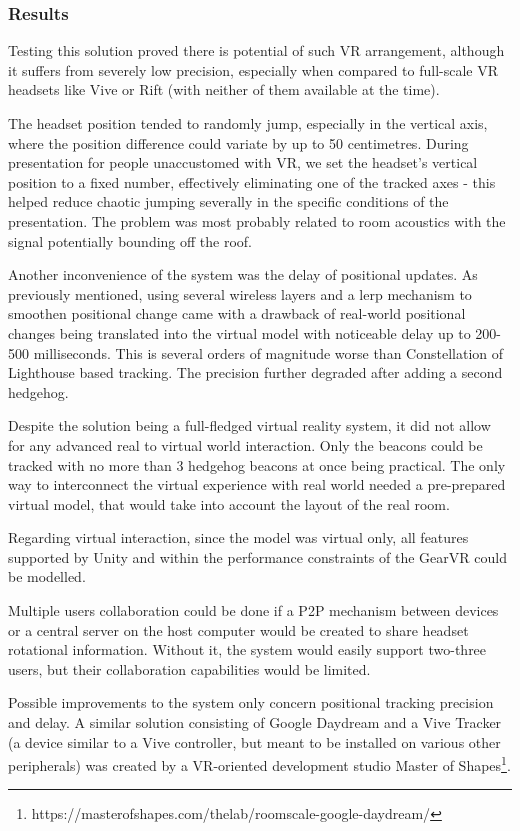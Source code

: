 \documentclass[12pt, a4paper]{article}
\begin{document}
\subsubsection{Results}
Testing this solution proved there is potential of such VR arrangement, although it suffers from severely low precision, especially when compared to full-scale VR headsets like Vive or Rift (with neither of them available at the time).

The headset position tended to randomly jump, especially in the vertical axis, where the position difference could variate by up to 50 centimetres. During presentation for people unaccustomed with VR, we set the headset’s vertical position to a fixed number, effectively eliminating one of the tracked axes - this helped reduce chaotic jumping severally in the specific conditions of the presentation. The problem was most probably related to room acoustics with the signal potentially bounding off the roof.

Another inconvenience of the system was the delay of positional updates. As previously mentioned, using several wireless layers and a lerp mechanism to smoothen positional change came with a drawback of real-world positional changes being translated into the virtual model with noticeable delay up to 200-500 milliseconds. This is several orders of magnitude worse than Constellation of Lighthouse based tracking. The precision further degraded after adding a second hedgehog.

Despite the solution being a full-fledged virtual reality system, it did not allow for any advanced real to virtual world interaction. Only the beacons could be tracked with no more than 3 hedgehog beacons at once being practical. The only way to interconnect the virtual experience with real world needed a pre-prepared virtual model, that would take into account the layout of the real room.

Regarding virtual interaction, since the model was virtual only, all features supported by Unity and within the performance constraints of the GearVR could be modelled.

Multiple users collaboration could be done if a P2P mechanism between devices or a central server on the host computer would be created to share headset rotational information. Without it, the system would easily support two-three users, but their collaboration capabilities would be limited.
	
	Possible improvements to the system only concern positional tracking precision and delay. A similar solution consisting of Google Daydream and a Vive Tracker (a device similar to a Vive controller, but meant to be installed on various other peripherals) was created by a VR-oriented development studio Master of Shapes\footnote{https://masterofshapes.com/thelab/roomscale-google-daydream/}.
	
\end{document}
